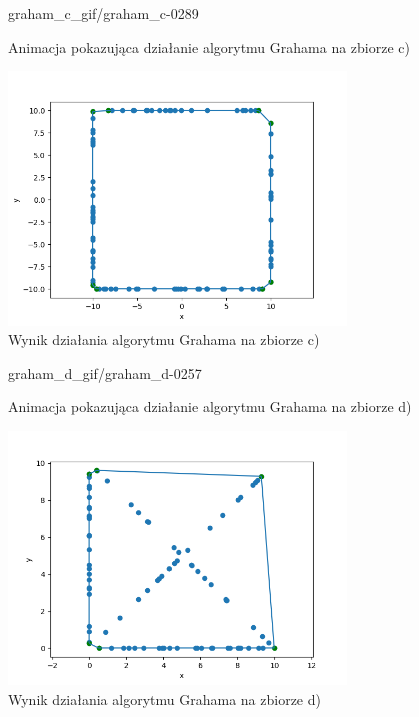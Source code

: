\documentclass[a4paper]{article}
\begin{document}
\begin{figure}[H]
    {graham_c_gif/graham_c-}{0}{289}
    \centering
    \caption{Animacja pokazująca działanie algorytmu Grahama na zbiorze c)}
    \label{fig:anim_graham_c}
\end{figure}

\begin{figure}[H]
    \centering
    \includegraphics[width=0.8\textwidth]{graham/graham_c_png.png}
    \caption{Wynik działania algorytmu Grahama na zbiorze c)}
    \label{fig:graham_c}
\end{figure}

\begin{figure}[H]
    {graham_d_gif/graham_d-}{0}{257}
    \centering
    \caption{Animacja pokazująca działanie algorytmu Grahama na zbiorze d)}
    \label{fig:anim_graham_d}
\end{figure}

\begin{figure}[H]
    \centering
    \includegraphics[width=0.8\textwidth]{graham/graham_d_png.png}
    \caption{Wynik działania algorytmu Grahama na zbiorze d)}
    \label{fig:graham_d}
\end{figure}
\end{document}
